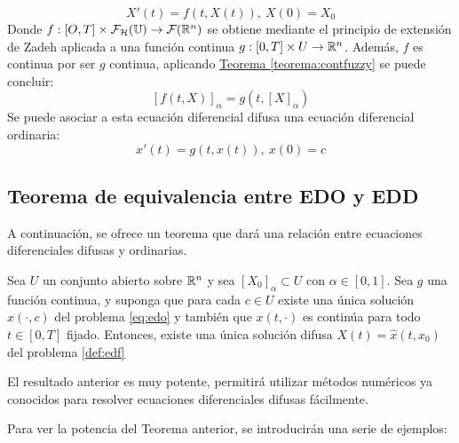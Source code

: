\begin{equation}
  \label{def:edf}
  X'(t) = f(t, X(t)), ~ X(0) = X_0
\end{equation}
Donde $f : [O, T] \times \mathcal{F}_\mathcal{H}(\mathbb U) \rightarrow \mathcal{F}(\mathbb R^n)$ se obtiene mediante el principio de extensión de Zadeh aplicada a una función continua $g : [0, T] \times U \rightarrow \mathbb R^n$. Además, $f$  es continua por ser $g$ continua, aplicando \hyperref[teorema:contfuzzy]{Teorema \ref*{teorema:contfuzzy}} se puede concluir:
\[
	[f(t, X)]_\alpha = g(t, [X]_\alpha)
\]
Se puede asociar a esta ecuación diferencial difusa una ecuación diferencial ordinaria:
\begin{equation}
	\label{eq:edo}
	x'(t) = g(t, x(t)), ~ x(0) = c
\end{equation}


\subsection{Teorema de equivalencia entre EDO y EDD}

A continuación, se ofrece un teorema que dará una relación entre ecuaciones diferenciales difusas y ordinarias.

\begin{teorema}
	\label{teorema:equivalencia}
	Sea $U$ un conjunto abierto sobre $\mathbb R^n$ y sea $[X_0]_\alpha \subset U$ con $\alpha \in [0, 1]$. Sea $g$ una función continua, y suponga que para cada $c \in U$ existe una única solución $x(\cdot, c)$ del problema \ref{eq:edo} y también que $x(t, \cdot)$ es continúa para todo $t \in [0, T]$ fijado. Entonces, existe una única solución difusa $X(t) = \hat{x}(t, x_0)$ del problema \ref{def:edf}
\end{teorema}
El resultado anterior es muy potente, permitirá utilizar métodos numéricos ya conocidos para resolver ecuaciones diferenciales difusas fácilmente.

Para ver la potencia del Teorema anterior, se introducirán una serie de ejemplos:

